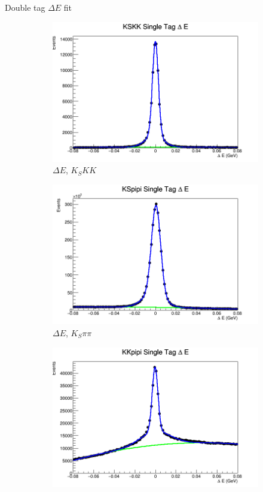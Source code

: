 \documentclass{beamer}
\begin{document}
\begin{frame}{Double tag $\Delta E$ fit}
  \begin{figure}
    \centering
    \begin{subfigure}{0.4\textwidth}
      \centering
      \includegraphics[width=\textwidth]{KSKKDeltaE.png}
      \caption{$\Delta E$, $K_SKK$}
    \end{subfigure}%
    \begin{subfigure}{0.4\textwidth}
      \centering
      \includegraphics[width=\textwidth]{KSpipiDeltaE.png}
      \caption{$\Delta E$, $K_S\pi\pi$}
    \end{subfigure}
    \begin{subfigure}{0.4\textwidth}
      \centering
      \includegraphics[width=\textwidth]{KKpipiDeltaE.png}

\end{subfigure}
\end{figure}
\end{frame}
\end{document}
